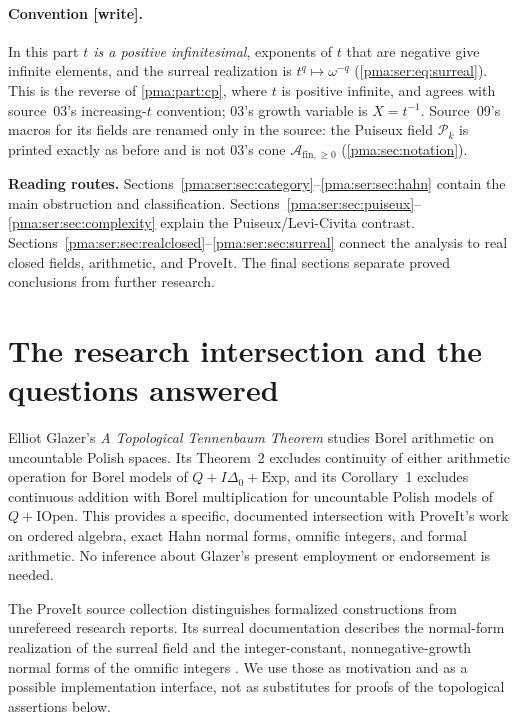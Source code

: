 \documentclass[11pt]{article}
\numberwithin{equation}{section}
\theoremstyle{definition}
\theoremstyle{remark}
\newcommand{\PP}{\mathcal A_{\mathrm{fin},\geq 0}}
\newcommand{\writetag}{\textup{\textsf{\small[write]}}}
\newcommand{\Pk}{\mathcal P_k}
\begin{document}
\paragraph{Convention \writetag.} In this part \emph{$t$ is a positive
infinitesimal}, exponents of $t$ that are negative give infinite elements, and
the surreal realization is $t^q\mapsto\omega^{-q}$ (\cref{pma:ser:eq:surreal}).
This is the reverse of \cref{pma:part:cp}, where $t$ is positive infinite, and
agrees with source~03's increasing-$t$ convention; 03's growth variable is
$X=t^{-1}$. Source~09's macros for its fields are renamed only in the source:
the Puiseux field $\Pk$ is printed exactly as before and is not 03's cone
$\PP$ (\cref{pma:sec:notation}).

\noindent\textbf{Reading routes.}
Sections~\ref{pma:ser:sec:category}--\ref{pma:ser:sec:hahn} contain the main obstruction and
classification. Sections~\ref{pma:ser:sec:puiseux}--\ref{pma:ser:sec:complexity} explain the
Puiseux/Levi-Civita contrast. Sections~\ref{pma:ser:sec:realclosed}--\ref{pma:ser:sec:surreal}
connect the analysis to real closed fields, arithmetic, and ProveIt.
The final sections separate proved conclusions from further research.

\section{The research intersection and the questions answered}
\label{pma:ser:sec:intro}

Elliot Glazer's \emph{A Topological Tennenbaum Theorem}
\cite{Glazer} studies Borel arithmetic on uncountable Polish spaces.
Its Theorem~2 excludes continuity of either arithmetic operation for Borel
models of $Q+I\Delta_0+\mathrm{Exp}$, and its Corollary~1 excludes continuous
addition with Borel multiplication for uncountable Polish models of
$Q+\mathrm{IOpen}$. This provides a specific, documented intersection with
ProveIt's work on ordered algebra, exact Hahn normal forms, omnific integers,
and formal arithmetic. No inference about Glazer's present employment or
endorsement is needed.

The ProveIt source collection distinguishes formalized constructions from
unrefereed research reports. Its surreal documentation describes the normal-form
realization of the surreal field and the integer-constant, nonnegative-growth
normal forms of the omnific integers \cite{s09:ProveIt}. We use those as motivation
and as a possible implementation interface, not as substitutes for proofs of
the topological assertions below.
\end{document}
